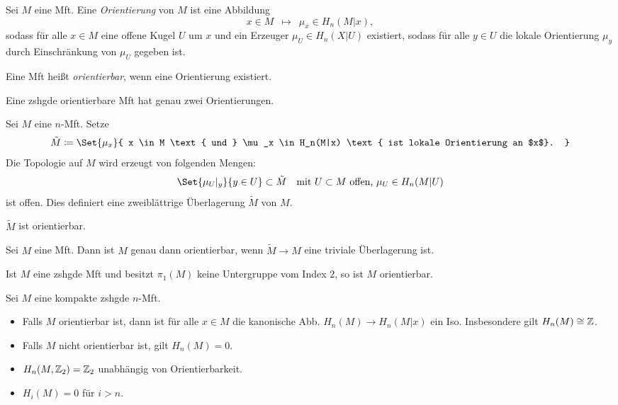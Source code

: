\documentclass{cheat-sheet}
\newcommand{\ZM}[1]{\Z_{#1}} %
\begin{document}

\begin{defn}
  Sei $M$ eine Mft. Eine \emph{Orientierung} von $M$ ist eine Abbildung
  \[ x \in M \enspace\mapsto\enspace \mu_x \in H_n(M|x), \]
  sodass für alle $x \in M$ eine offene Kugel $U$ um $x$ und ein Erzeuger $\mu_U \in H_n(X|U)$ existiert, sodass für alle $y \in U$ die lokale Orientierung $\mu_y$ durch Einschränkung von $\mu_U$ gegeben ist.
\end{defn}

\begin{defn}
  Eine Mft heißt \emph{orientierbar}, wenn eine Orientierung existiert.
\end{defn}

\begin{prop}
Eine zshgde orientierbare Mft hat genau zwei Orientierungen.
\end{prop}


\begin{defn}
  Sei $M$ eine $n$-Mft. Setze
  \[ \tilde{M} \coloneqq \Set{ \mu_x }{ x \in M \text{ und } \mu_x \in H_n(M|x) \text{ ist lokale Orientierung an $x$}. } \]
  Die Topologie auf $M$ wird erzeugt von folgenden Mengen:
  \[
    \Set{ \mu_U|_y }{ y \in U } \subset \tilde{M}
    \quad \text{mit $U \subset M$ offen, $\mu_U \in H_n(M|U)$}
  \]
  ist offen. Dies definiert eine zweiblättrige Überlagerung $\tilde{M}$ von $M$.
\end{defn}

\begin{prop}
  $\tilde{M}$ ist orientierbar.
\end{prop}

\begin{prop}
  Sei $M$ eine Mft. Dann ist $M$ genau dann orientierbar, wenn $\tilde{M} \to M$ eine triviale Überlagerung ist.
\end{prop}

\begin{kor}
  Ist $M$ eine zshgde Mft und besitzt $\pi_1(M)$ keine Untergruppe vom Index $2$, so ist $M$ orientierbar.
\end{kor}

\begin{prop}
  Sei $M$ eine kompakte zshgde $n$-Mft.
  \begin{itemize}
    \item Falls $M$ orientierbar ist, dann ist für alle $x \in M$ die kanonische Abb. $H_n(M) \to H_n(M|x)$ ein Iso. Insbesondere gilt $H_n(M) \cong \mathbb{Z}$.
    \item Falls $M$ nicht orientierbar ist, gilt $H_n(M) = 0$.
    \item $H_n(M, \ZM{2}) = \ZM{2}$ unabhängig von Orientierbarkeit.
    \item $H_i(M) = 0$ für $i > n$.
  \end{itemize}
\end{prop}
\end{document}
